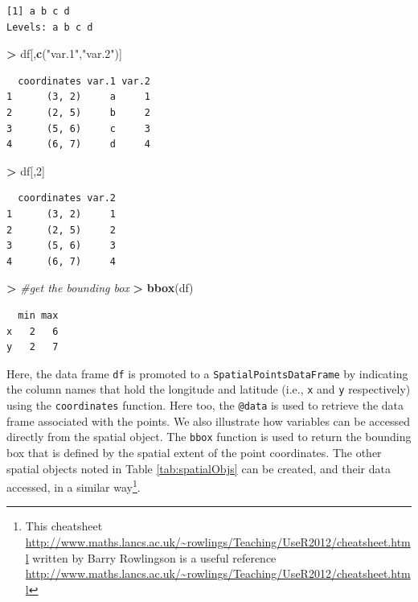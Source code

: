 \documentclass[
]{krantz}
\makeatletter
\newenvironment{Shaded}{\begin{snugshade}}{\end{snugshade}}
\newcommand{\CommentTok}[1]{\textcolor[rgb]{0.37,0.37,0.37}{\textit{#1}}}
\newcommand{\DecValTok}[1]{\textcolor[rgb]{0.06,0.06,0.06}{#1}}
\newcommand{\ErrorTok}[1]{\textcolor[rgb]{0.14,0.14,0.14}{\textbf{#1}}}
\newcommand{\KeywordTok}[1]{\textcolor[rgb]{0.27,0.27,0.27}{\textbf{#1}}}
\newcommand{\NormalTok}[1]{#1}
\newcommand{\OperatorTok}[1]{\textcolor[rgb]{0.43,0.43,0.43}{\textbf{#1}}}
\newcommand{\StringTok}[1]{\textcolor[rgb]{0.5,0.5,0.5}{#1}}
\newenvironment{kframe}{%
\medskip{}
\setlength{\fboxsep}{.8em}
 \def\at@end@of@kframe{}%
 \ifinner\ifhmode%
  \def\at@end@of@kframe{\end{minipage}}%
  \begin{minipage}{\columnwidth}%
 \fi\fi%
 \def\FrameCommand##1{\hskip\@totalleftmargin \hskip-\fboxsep
 \colorbox{shadecolor}{##1}\hskip-\fboxsep
     \hskip-\linewidth \hskip-\@totalleftmargin \hskip\columnwidth}%
 \MakeFramed {\advance\hsize-\width
   \@totalleftmargin\z@ \linewidth\hsize
   \@setminipage}}%
 {\par\unskip\endMakeFramed%
 \at@end@of@kframe}
\renewenvironment{Shaded}{\begin{kframe}}{\end{kframe}}
\makeatother
\begin{document}
\begin{verbatim}
[1] a b c d
Levels: a b c d
\end{verbatim}

\begin{Shaded}
\begin{Highlighting}[]
\OperatorTok{\textgreater{}}\StringTok{ }\NormalTok{df[,}\KeywordTok{c}\NormalTok{(}\StringTok{"var.1"}\NormalTok{,}\StringTok{"var.2"}\NormalTok{)]}
\end{Highlighting}
\end{Shaded}

\begin{verbatim}
  coordinates var.1 var.2
1      (3, 2)     a     1
2      (2, 5)     b     2
3      (5, 6)     c     3
4      (6, 7)     d     4
\end{verbatim}

\begin{Shaded}
\begin{Highlighting}[]
\OperatorTok{\textgreater{}}\StringTok{ }\NormalTok{df[,}\DecValTok{2}\NormalTok{]}
\end{Highlighting}
\end{Shaded}

\begin{verbatim}
  coordinates var.2
1      (3, 2)     1
2      (2, 5)     2
3      (5, 6)     3
4      (6, 7)     4
\end{verbatim}

\begin{Shaded}
\begin{Highlighting}[]
\OperatorTok{\textgreater{}}\StringTok{ }\CommentTok{\#get the bounding box}
\ErrorTok{\textgreater{}}\StringTok{ }\KeywordTok{bbox}\NormalTok{(df)}
\end{Highlighting}
\end{Shaded}

\begin{verbatim}
  min max
x   2   6
y   2   7
\end{verbatim}

Here, the data frame \texttt{df} is promoted to a \texttt{SpatialPointsDataFrame} by indicating the column names that hold the longitude and latitude (i.e., \texttt{x} and \texttt{y} respectively) using the \texttt{coordinates} function. Here too, the \texttt{@data} is used to retrieve the data frame associated with the points. We also illustrate how variables can be accessed directly from the spatial object. The \texttt{bbox} function is used to return the bounding box that is defined by the spatial extent of the point coordinates. The other spatial objects noted in Table \ref{tab:spatialObjs} can be created, and their data accessed, in a similar way\footnote{This cheatsheet \url{http://www.maths.lancs.ac.uk/~rowlings/Teaching/UseR2012/cheatsheet.html} written by Barry Rowlingson is a useful reference \url{http://www.maths.lancs.ac.uk/~rowlings/Teaching/UseR2012/cheatsheet.html}}.
\end{document}
